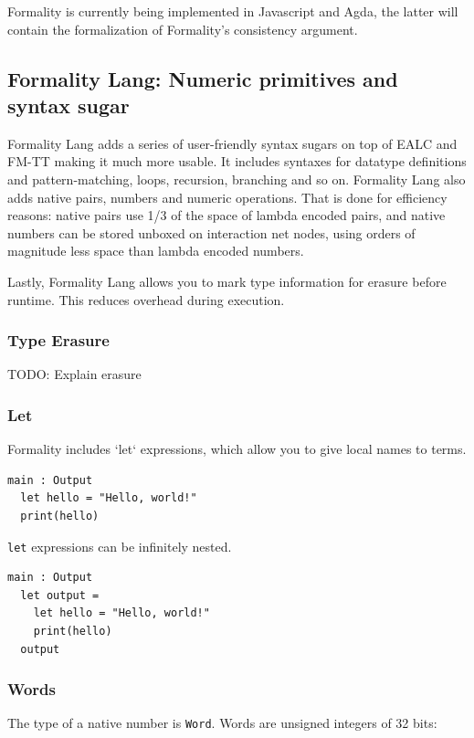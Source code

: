 \documentclass{article}
\theoremstyle{definition}
\theoremstyle{theorem}
\begin{document}
Formality is currently being implemented in Javascript and Agda, the latter will
contain the formalization of Formality's consistency argument.


\subsection{Formality Lang: Numeric primitives and syntax sugar}

Formality Lang adds a series of user-friendly syntax sugars on top of EALC and
FM-TT making it much more usable.  It includes syntaxes for
datatype definitions and pattern-matching, loops, recursion, branching and so
on.
Formality Lang also adds native pairs, numbers and numeric operations. That is
done for efficiency reasons: native pairs use 1/3 of the space of lambda encoded
pairs, and native numbers can be stored unboxed on interaction net nodes, using
orders of magnitude less space than lambda encoded numbers.

Lastly, Formality Lang allows you to mark type information for erasure before
runtime. This reduces overhead during execution.


\subsubsection{Type Erasure}

TODO: Explain erasure

\subsubsection{Let}

Formality includes `let` expressions, which allow you to give local names to
terms.

\begin{lstlisting}
main : Output
  let hello = "Hello, world!"
  print(hello)
\end{lstlisting}

\verb|let| expressions can be infinitely nested.

\begin{lstlisting}
main : Output
  let output =
    let hello = "Hello, world!"
    print(hello)
  output
\end{lstlisting}

\subsubsection{Words}

The type of a native number is \verb|Word|. Words are unsigned integers of 32
bits:
\end{document}
